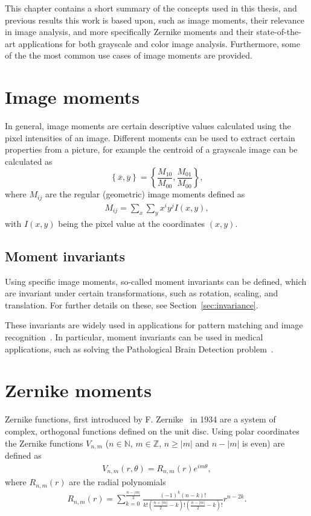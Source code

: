 This chapter contains a short summary of the concepts used in this thesis, and previous results this work is based upon, such as image moments, their relevance in image analysis, and more specifically Zernike moments and their state-of-the-art applications for both grayscale and color image analysis. Furthermore, some of the the most common use cases of image moments are provided.

\section{Image moments}
In general, image moments are certain descriptive values calculated using the pixel intensities of an image. Different moments can be used to extract certain properties from a picture, for example the centroid of a grayscale image can be calculated as
$$
\left\{ \overline{x}, \overline{y} \right\} = \left\{ \frac{M_{10}}{M_{00}},  \frac{M_{01}}{M_{00}} \right\},
$$ where $M_{ij}$ are the regular (geometric) image moments defined as
\begin{gather}
M_{ij} =  \sum_x \sum_y x^i y^j I(x,y) \label{eq:regular_moment},
\end{gather} with $I(x,y)$ being the pixel value at the coordinates $(x,y)$.

\subsection{Moment invariants}
Using specific image moments, so-called moment invariants can be defined, which are invariant under certain transformations, such as rotation, scaling, and translation. For further details on these, see Section~\ref{sec:invariance}.

These invariants are widely used in applications for pattern matching and image recognition~\cite{app1, app2, app3}. In particular, moment invariants can be used in medical applications, such as solving the Pathological Brain Detection problem~\cite{med_app_1}.

\section{Zernike moments}
Zernike functions, first introduced by F. Zernike~\cite{zernike} in 1934 are a system of complex, orthogonal functions defined on the unit disc. Using polar coordinates the Zernike functions $V_{n,m}$ ($n \in \mathds{N}$, $m \in \mathds{Z}$, $n \geq |m|$ and $n - |m|$ is even) are defined as
\begin{gather*}
  V_{n,m}(r,\theta) = R_{n,m}(r) e^{i m\theta},
\end{gather*}
where $ R_{n,m}(r) $ are the radial polynomials
\begin{gather}
  R_{n,m}(r) = \sum_{k=0}^{\frac{n - |m|}{2}}\frac{(-1)^k (n - k)!}{k!\left(\frac{n + |m|}{2} - k\right)!\left(\frac{n - |m|}{2} - k\right)!}r^{n-2k} \label{eq:radial_poly}.
\end{gather}

